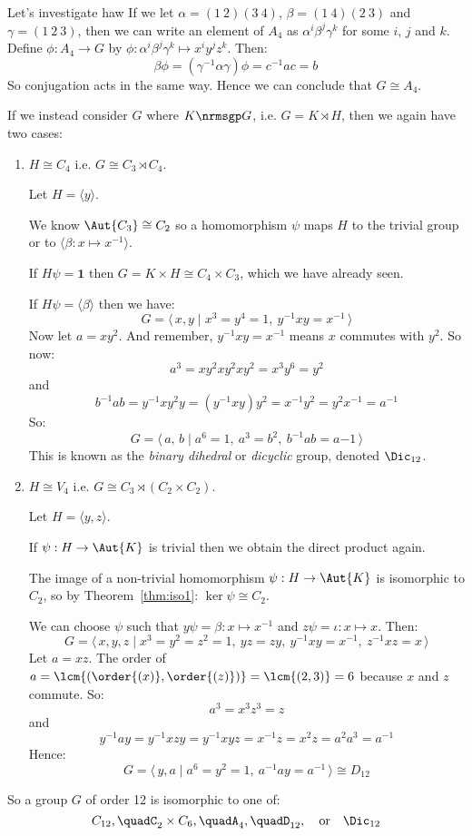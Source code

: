 \begin{enumerate}
        Let's investigate haw
        If we let \(\alpha = (1\ 2)(3\ 4)\), \(\beta = (1\ 4)(2\ 3)\) and \(\gamma = (1\ 2\ 3)\), then we can write an
        element of \(A_4\) as \(\alpha^i\beta^j\gamma^k\) for some \(i\), \(j\) and \(k\).
        Define \(\phi:A_4 \to G\) by \(\phi:\alpha^i\beta^j\gamma^k \mapsto x^{i}y^{j}z^{k}\).
        Then:
        \[\beta\phi = (\gamma^{-1}\alpha\gamma)\phi = c^{-1}ac = b\]
        So conjugation acts in the same way.
        Hence we can conclude that \(G \cong A_4\).
\end{enumerate}

If we instead consider \(G\) where \(K \nrmsgp G\), i.e. \(G = K \rtimes H\), then we again have two cases:

\begin{enumerate}
    \item \(H \cong C_4\) i.e. \(G \cong C_3 \rtimes C_4\).

        Let \(H = \langle y \rangle\).

        We know \(\Aut{C_3} \cong C_2\) so a homomorphism \(\psi\) maps \(H\) to the trivial group or to \(\langle
        \beta:x \mapsto x^{-1} \rangle\).

        If \(H\psi = \bm{1}\) then \(G = K \times H \cong C_4 \times C_3\), which we have already seen.

        If \(H\psi = \langle \beta \rangle\) then we have:
        \[G = \langle\, x, y \mid x^3 = y^4 = 1,\ y^{-1}xy = x^{-1}\,\rangle\]
        Now let \(a = xy^2\).
        And remember, \(y^{-1}xy = x^{-1}\) means \(x\) commutes with \(y^2\).
        So now:
        \[a^3 = xy^2xy^2xy^2 = x^3y^6 = y^2\]
        and
        \[b^{-1}ab = y^{-1}xy^2y = (y^{-1}xy)y^2 = x^{-1}y^2 = y^2x^{-1} = a^{-1}\]
        So:
        \[G = \langle\, a,\,b \mid a^6 = 1,\ a^3 = b^2,\ b^{-1}ab = a{-1}\,\rangle\]
        This is known as the \emph{binary dihedral} or \emph{dicyclic} group, denoted \(\Dic_{12}\).

    \item \(H \cong V_4\) i.e. \(G \cong C_3 \rtimes (C_2 \times C_2)\).

        Let \(H = \langle y, z \rangle\).

        If \(\psi:H \to \Aut{K}\) is trivial then we obtain the direct product again.

        The image of a non-trivial homomorphism \(\psi:H \to \Aut{K}\) is isomorphic to \(C_2\), so by
        Theorem~\ref{thm:iso1}: \(\ker{\psi} \cong C_2\).

        We can choose \(\psi\) such that \(y\psi = \beta:x \mapsto x^{-1}\) and \(z\psi = \iota:x \mapsto x\).
        Then:
        \[G = \langle\, x, y, z \mid x^3 = y^2 = z^2 = 1,\ yz = zy,\ y^{-1}xy = x^{-1},\ z^{-1}xz = x\,\rangle\]
        Let \(a = xz\).
        The order of \(a = \lcm{(\order{(x)}, \order{(z)})} = \lcm{(2, 3)} = 6\) because \(x\) and \(z\) commute.
        So:
        \[a^3 = x^3z^3 = z\]
        and
        \[ y^{-1}ay = y^{-1}xzy = y^{-1}xyz = x^{-1}z = x^2z = a^2a^3 = a^{-1}\]
        Hence:
        \[G = \langle\, y, a \mid a^6 = y^2 = 1,\ a^{-1}ay = a^{-1}\,\rangle
        \cong D_{12}\]
\end{enumerate}

So a group \(G\) of order 12 is isomorphic to one of:
\[
    C_{12}, \quad%
    C_2 \times C_6, \quad%
    A_4, \quad%
    D_{12}, \quad \text{or} \quad%
    \Dic_{12}
\]

